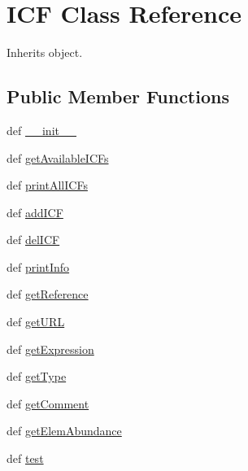 \hypertarget{classpyneb_1_1core_1_1icf_1_1_i_c_f}{\section{I\-C\-F Class Reference}
\label{classpyneb_1_1core_1_1icf_1_1_i_c_f}
}


Inherits object.

\subsection*{Public Member Functions}
\begin{DoxyCompactItemize}
\item 
def \hyperlink{classpyneb_1_1core_1_1icf_1_1_i_c_f_ac775ee34451fdfa742b318538164070e}{\-\_\-\-\_\-init\-\_\-\-\_\-}
\item 
def \hyperlink{classpyneb_1_1core_1_1icf_1_1_i_c_f_a365128eb89849533640b78f781bcef94}{get\-Available\-I\-C\-Fs}
\item 
def \hyperlink{classpyneb_1_1core_1_1icf_1_1_i_c_f_ad530019d003039a8222c4fcd1fd63bf9}{print\-All\-I\-C\-Fs}
\item 
def \hyperlink{classpyneb_1_1core_1_1icf_1_1_i_c_f_a626a45156c96e22cb9894b58d492fd0d}{add\-I\-C\-F}
\item 
def \hyperlink{classpyneb_1_1core_1_1icf_1_1_i_c_f_aca8fd4c7accb7f98e638d2b0325ca4aa}{del\-I\-C\-F}
\item 
def \hyperlink{classpyneb_1_1core_1_1icf_1_1_i_c_f_abf1cd85011606ca932f280cafb1274ee}{print\-Info}
\item 
def \hyperlink{classpyneb_1_1core_1_1icf_1_1_i_c_f_ab32735aadf7c3aa3f911f53cce2846fe}{get\-Reference}
\item 
def \hyperlink{classpyneb_1_1core_1_1icf_1_1_i_c_f_a9927fbb89f5a7717e46257572a22a37c}{get\-U\-R\-L}
\item 
def \hyperlink{classpyneb_1_1core_1_1icf_1_1_i_c_f_a1a87f3117a4b35419a15ef98a4696f82}{get\-Expression}
\item 
def \hyperlink{classpyneb_1_1core_1_1icf_1_1_i_c_f_a351f832b10a907ba4dc55d7ca7ba7d52}{get\-Type}
\item 
def \hyperlink{classpyneb_1_1core_1_1icf_1_1_i_c_f_a955490704102108c962e96154a05ab57}{get\-Comment}
\item 
def \hyperlink{classpyneb_1_1core_1_1icf_1_1_i_c_f_a51612cb7c4ec8fcfc8bb46c4aa4f163f}{get\-Elem\-Abundance}
\item 
def \hyperlink{classpyneb_1_1core_1_1icf_1_1_i_c_f_a3a5311f944836a8f4795a2506b37331d}{test}
\end{DoxyCompactItemize}
